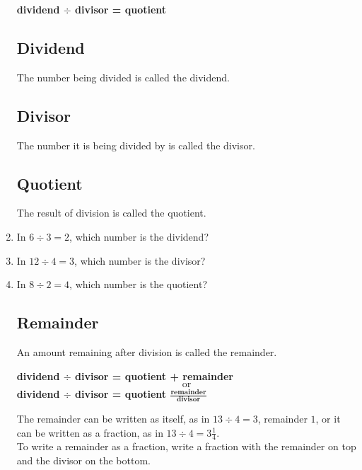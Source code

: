 \documentclass{article}
\begin{document}
\begin{enumerate}
\begin{center}
\textbf{dividend $\div$ divisor = quotient}
\end{center}

\subsection*{Dividend}
The number being divided is called the dividend.\\

\subsection*{Divisor}
The number it is being divided by is called the divisor.\\

\subsection*{Quotient}
The result of division is called the quotient.\\

\item In $6 \div 3 = 2$, which number is the dividend?
\item In $12 \div 4 = 3$, which number is the divisor?
\item In $8 \div 2 = 4$, which number is the quotient?

\newpage

\subsection*{Remainder}
An amount remaining after division is called the remainder.\\

\begin{center}
\small
\textbf{dividend $\div$ divisor = quotient + remainder}\\
$$\textrm{or}$$
\textbf{dividend $\div$ divisor = quotient $\frac{\textbf{remainder}}{\textbf{divisor}}$}\\
\normalsize
\end{center}

The remainder can be written as itself, as in $13 \div 4 = 3$, remainder $1$, or it can be written as a fraction, as in $13 \div 4 = 3 \frac{1}{4}$.\\

To write a remainder as a fraction, write a fraction with the remainder on top and the divisor on the bottom.\\


\end{enumerate}
\end{document}
